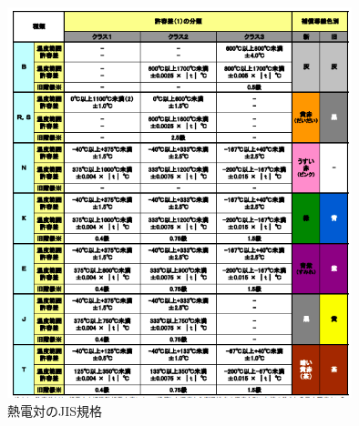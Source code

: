 \documentclass[a4paper,11pt,uplatex]{jsarticle}
\begin{document}
\begin{description}
\begin{figure}[H]
\begin{center}
      \includegraphics[width = 10cm]{画像/熱電対.png}
      \caption{熱電対のJIS規格}
      \label{熱電対のJIS規格}
    \end{center}
  \end{figure}
\end{description}
\end{document}
